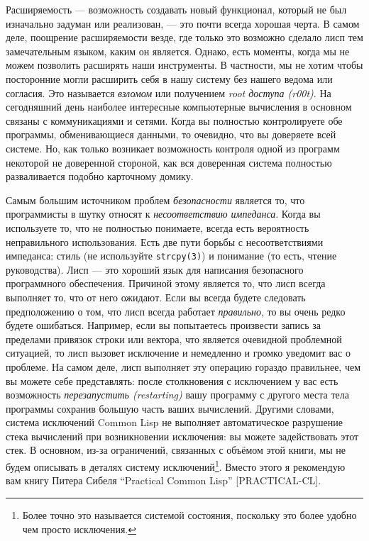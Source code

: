 Расширяемость --- возможность создавать новый функционал, который не был изначально задуман или реализован, --- это почти всегда хорошая черта. В самом деле, поощрение расширяемости везде, где только это возможно сделало лисп тем замечательным языком, каким он является. Однако, есть моменты, когда мы не можем позволить расширять наши инструменты. В частности, мы не хотим чтобы посторонние могли расширить себя в нашу систему без нашего ведома или согласия. Это называется \emph{взломом} или получением \emph{root доступа (r00t)}. На сегодняшний день наиболее интересные компьютерные вычисления в основном связаны с коммуникациями и сетями. Когда вы полностью контролируете обе программы, обменивающиеся данными, то очевидно, что вы доверяете всей системе. Но, как только возникает возможность контроля одной из программ некоторой не доверенной стороной, как вся доверенная система полностью разваливается подобно карточному домику.

Самым большим источником проблем \emph{безопасности} является то, что программисты в шутку относят к \emph{несоответствию импеданса}. Когда вы используете то, что не полностью понимаете, всегда есть вероятность неправильного использования. Есть две пути борьбы с несоответствиями импеданса: стиль (не используйте \verb"strcpy(3)") и понимание (то есть, чтение руководства). Лисп --- это хороший язык для написания безопасного программного обеспечения. Причиной этому является то, что лисп всегда выполняет то, что от него ожидают. Если вы всегда будете следовать предположению о том, что лисп всегда работает \emph{правильно}, то вы очень редко будете ошибаться. Например, если вы попытаетесь произвести запись за пределами привязок строки или вектора, что является очевидной проблемной ситуацией, то лисп вызовет исключение и немедленно и громко уведомит вас о проблеме. На самом деле, лисп выполняет эту операцию гораздо правильнее, чем вы можете себе представлять: после столкновения с исключением у вас есть возможность \emph{перезапустить (restarting)} вашу программу с другого места тела программы сохранив большую часть ваших вычислений. Другими словами, система исключений Common Lisp не выполняет автоматическое разрушение стека вычислений при возникновении исключения: вы можете задействовать этот стек. В основном, из-за ограничений, связанных с объёмом этой книги, мы не будем описывать в деталях систему исключений\footnote{Более точно это называется системой состояния, поскольку это более удобно чем просто исключения.}. Вместо этого я рекомендую вам книгу Питера Сибеля ``Practical Common Lisp'' [PRACTICAL-CL].

